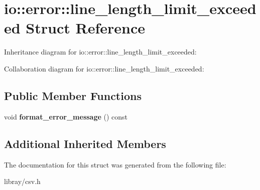 \hypertarget{structio_1_1error_1_1line__length__limit__exceeded}{}\section{io\+:\+:error\+:\+:line\+\_\+length\+\_\+limit\+\_\+exceeded Struct Reference}
\label{structio_1_1error_1_1line__length__limit__exceeded}


Inheritance diagram for io\+:\+:error\+:\+:line\+\_\+length\+\_\+limit\+\_\+exceeded\+:


Collaboration diagram for io\+:\+:error\+:\+:line\+\_\+length\+\_\+limit\+\_\+exceeded\+:
\subsection*{Public Member Functions}
\begin{DoxyCompactItemize}
\item 
\mbox{\label{structio_1_1error_1_1line__length__limit__exceeded_ae6ef1cf3ed1d82804953ac120892b85e}} 
void {\bfseries format\+\_\+error\+\_\+message} () const
\end{DoxyCompactItemize}
\subsection*{Additional Inherited Members}


The documentation for this struct was generated from the following file\+:\begin{DoxyCompactItemize}
\item 
libray/csv.\+h\end{DoxyCompactItemize}
